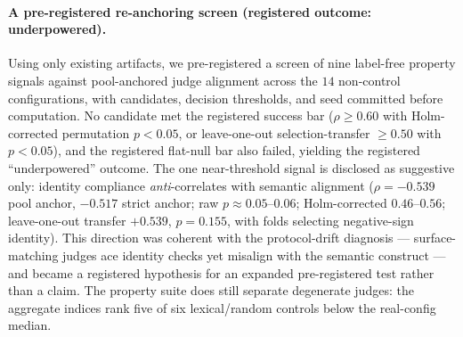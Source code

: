 \documentclass{article}
\begin{document}
\paragraph{A pre-registered re-anchoring screen (registered outcome: underpowered).}
Using only existing artifacts, we pre-registered a screen of nine label-free property signals against pool-anchored judge alignment across the \(14\) non-control configurations, with candidates, decision thresholds, and seed committed before computation.
No candidate met the registered success bar (\(\rho \ge 0.60\) with Holm-corrected permutation \(p<0.05\), or leave-one-out selection-transfer \(\ge 0.50\) with \(p<0.05\)), and the registered flat-null bar also failed, yielding the registered ``underpowered'' outcome.
The one near-threshold signal is disclosed as suggestive only: identity compliance \emph{anti}-correlates with semantic alignment (\(\rho=-0.539\) pool anchor, \(-0.517\) strict anchor; raw \(p\approx 0.05\)--\(0.06\); Holm-corrected \(0.46\)--\(0.56\); leave-one-out transfer \(+0.539\), \(p=0.155\), with folds selecting negative-sign identity).
This direction was coherent with the protocol-drift diagnosis --- surface-matching judges ace identity checks yet misalign with the semantic construct --- and became a registered hypothesis for an expanded pre-registered test rather than a claim.
The property suite does still separate degenerate judges: the aggregate indices rank five of six lexical/random controls below the real-config median.
\end{document}
